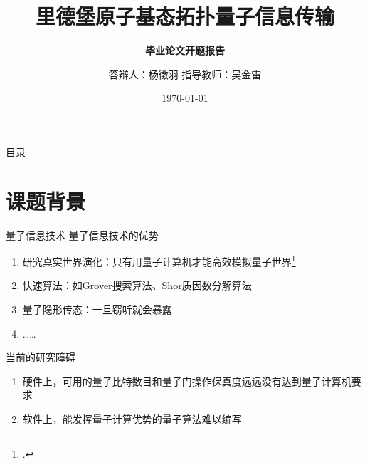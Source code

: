 \documentclass[10pt,aspectratio=43]{beamer}
\title{里德堡原子基态拓扑量子信息传输}
\subtitle{\fontsize{9pt}{14pt}\textbf{毕业论文开题报告}}
\author{答辩人：杨徵羽 \quad 指导教师：吴金雷}
\institute{哈尔滨工业大学(威海)理学院}
\date{\today}
\begin{document}
\frame{\titlepage}

\section[目录]{}   %
\begin{frame}{目录}
\tableofcontents
\end{frame}

\section{课题背景}
\begin{frame}{量子信息技术}
量子信息技术的优势
\begin{enumerate}
\item 研究真实世界演化：只有用量子计算机才能高效模拟量子世界\footcite{1999Simulating}%
\item 快速算法：如Grover搜索算法、Shor质因数分解算法
\item 量子隐形传态：一旦窃听就会暴露
\item ……
\end{enumerate}
当前的研究障碍
\begin{enumerate}
\item 硬件上，可用的量子比特数目和量子门操作保真度远远没有达到量子计算机要求
\item 软件上，能发挥量子计算优势的量子算法难以编写
\end{enumerate}
\end{frame}
\end{document}
